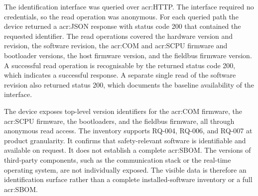 The identification interface was queried over \gls{acr:HTTP}. The interface required no credentials, so the read operation was anonymous. For each queried path the device returned a \gls{acr:JSON} response with status code 200 that contained the requested identifier. The read operations covered the hardware version and revision, the software revision, the \gls{acr:COM} and \gls{acr:SCPU} firmware and bootloader versions, the host firmware version, and the fieldbus firmware version. A successful read operation is recognisable by the returned status code 200, which indicates a successful response. A separate single read of the software revision also returned status 200, which documents the baseline availability of the interface.

The device exposes top-level version identifiers for the \gls{acr:COM} firmware, the \gls{acr:SCPU} firmware, the bootloaders, and the fieldbus firmware, all through anonymous read access. The inventory supports RQ-004, RQ-006, and RQ-007 at product granularity. It confirms that safety-relevant software is identifiable and available on request. It does not establish a complete \gls{acr:SBOM}. The versions of third-party components, such as the communication stack or the real-time operating system, are not individually exposed. The visible data is therefore an identification surface rather than a complete installed-software inventory or a full \gls{acr:SBOM}.




